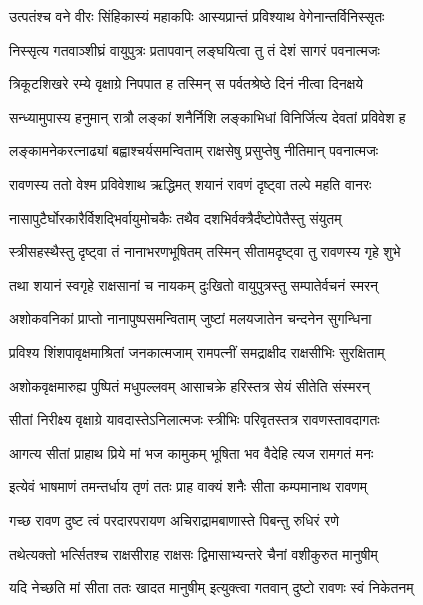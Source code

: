 \twolineshloka
{उत्पतंश्च वने वीरः सिंहिकास्यं महाकपिः}
{आस्यप्रान्तं प्रविश्याथ वेगेनान्तर्विनिस्सृतः} %

\twolineshloka
{निस्सृत्य गतवाञ्शीघ्रं वायुपुत्रः प्रतापवान्}
{लङ्घयित्वा तु तं देशं सागरं पवनात्मजः} %

\twolineshloka
{त्रिकूटशिखरे रम्ये वृक्षाग्रे निपपात ह}
{तस्मिन् स पर्वतश्रेष्ठे दिनं नीत्वा दिनक्षये} %

\twolineshloka
{सन्ध्यामुपास्य हनुमान् रात्रौ लङ्कां शनैर्निशि}
{लङ्काभिधां विनिर्जित्य देवतां प्रविवेश ह} %

\twolineshloka
{लङ्कामनेकरत्नाढ्यां बह्वाश्चर्यसमन्विताम्}
{राक्षसेषु प्रसुप्तेषु नीतिमान् पवनात्मजः} %

\twolineshloka
{रावणस्य ततो वेश्म प्रविवेशाथ ऋद्धिमत्}
{शयानं रावणं दृष्ट्वा तल्पे महति वानरः} %

\twolineshloka
{नासापुटैर्घोरकारैर्विशद्भिर्वायुमोचकैः}
{तथैव दशभिर्वक्त्रैर्दंष्टोपेतैस्तु संयुतम्} %

\twolineshloka
{स्त्रीसहस्थैस्तु दृष्ट्वा तं नानाभरणभूषितम्}
{तस्मिन् सीतामदृष्ट्वा तु रावणस्य गृहे शुभे} %

\twolineshloka
{तथा शयानं स्वगृहे राक्षसानां च नायकम्}
{दुःखितो वायुपुत्रस्तु सम्पातेर्वचनं स्मरन्} %

\twolineshloka
{अशोकवनिकां प्राप्तो नानापुष्पसमन्विताम्}
{जुष्टां मलयजातेन चन्दनेन सुगन्धिना} %

\twolineshloka
{प्रविश्य शिंशपावृक्षमाश्रितां जनकात्मजाम्}
{रामपत्नीं समद्राक्षीद राक्षसीभिः सुरक्षिताम्} %

\twolineshloka
{अशोकवृक्षमारुह्य पुष्पितं मधुपल्लवम्}
{आसाचक्रे हरिस्तत्र सेयं सीतेति संस्मरन्} %

\twolineshloka
{सीतां निरीक्ष्य वृक्षाग्रे यावदास्तेऽनिलात्मजः}
{स्त्रीभिः परिवृतस्तत्र रावणस्तावदागतः} %

\twolineshloka
{आगत्य सीतां प्राहाथ प्रिये मां भज कामुकम्}
{भूषिता भव वैदेहि त्यज रामगतं मनः} %

\twolineshloka
{इत्येवं भाषमाणं तमन्तर्धाय तृणं ततः}
{प्राह वाक्यं शनैः सीता कम्पमानाथ रावणम्} %

\twolineshloka
{गच्छ रावण दुष्ट त्वं परदारपरायण}
{अचिराद्रामबाणास्ते पिबन्तु रुधिरं रणे} %

\twolineshloka
{तथेत्यक्तो भर्त्सितश्च राक्षसीराह राक्षसः}
{द्विमासाभ्यन्तरे चैनां वशीकुरुत मानुषीम्} %

\twolineshloka
{यदि नेच्छति मां सीता ततः खादत मानुषीम्}
{इत्युक्त्वा गतवान् दुष्टो रावणः स्वं निकेतनम्} %

